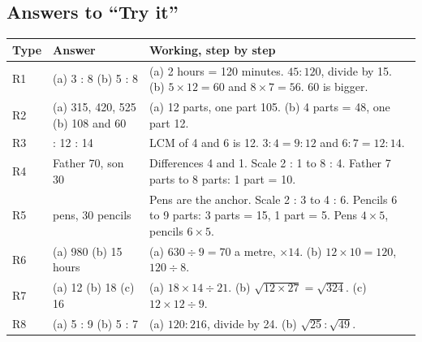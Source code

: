 \documentclass[11pt,a4paper]{article}
\let\oldsubsection\subsection
\renewcommand{\subsection}{\needspace{9\baselineskip}\oldsubsection}
\begin{document}
\subsection*{Answers to ``Try it''}
\begin{center}\small\renewcommand{\arraystretch}{1.25}\setlength{\tabcolsep}{8pt}
\begin{tabularx}{\linewidth}{@{}l>{\raggedright\arraybackslash}p{3.4cm}>{\raggedright\arraybackslash}X@{}}
\toprule
\textbf{\color{slate}Type} & \textbf{\color{slate}Answer} & \textbf{\color{slate}Working, step by step} \\ \midrule
R1 & (a) 3 : 8 \newline (b) 5 : 8 & (a) 2 hours = 120 minutes. $45 : 120$, divide by 15. \newline (b) $5 \times 12 = 60$ and $8 \times 7 = 56$. 60 is bigger. \\
R2 & (a) 315, 420, 525 \newline (b) 108 and 60 & (a) 12 parts, one part 105. \newline (b) 4 parts = 48, one part 12. \\
R3 & 9 : 12 : 14 & LCM of 4 and 6 is 12. \newline $3 : 4 = 9 : 12$ and $6 : 7 = 12 : 14$. \\
R4 & Father 70, son 30 & Differences 4 and 1. Scale 2 : 1 to 8 : 4. \newline Father 7 parts to 8 parts: 1 part = 10. \\
R5 & 20 pens, 30 pencils & Pens are the anchor. Scale 2 : 3 to 4 : 6. \newline Pencils 6 to 9 parts: 3 parts = 15, 1 part = 5. \newline Pens $4 \times 5$, pencils $6 \times 5$. \\
R6 & (a) 980 \newline (b) 15 hours & (a) $630 \div 9 = 70$ a metre, $\times 14$. \newline (b) $12 \times 10 = 120$, $120 \div 8$. \\
R7 & (a) 12 \newline (b) 18 \newline (c) 16 & (a) $18 \times 14 \div 21$. \newline (b) $\sqrt{12 \times 27} = \sqrt{324}$. \newline (c) $12 \times 12 \div 9$. \\
R8 & (a) 5 : 9 \newline (b) 5 : 7 & (a) $120 : 216$, divide by 24. \newline (b) $\sqrt{25} : \sqrt{49}$. \\

\end{tabularx}
\end{center}
\end{document}
